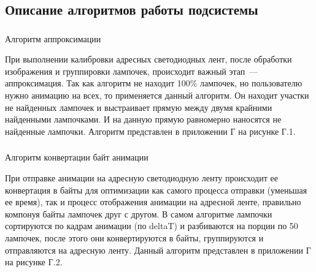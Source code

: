 \subsection{Описание алгоритмов работы подсистемы}
\label{sec:develop:algorithms}

\subsubsection{} Алгоритм аппроксимации
\label{sec:develop:algorithms:approximation}

При выполнении калибровки адресных светодиодных лент, после обработки изображения и группировки лампочек, происходит важный этап~--- аппроксимация. Так как алгоритм не находит 100\% лампочек, но пользователю нужно анимацию на всех, то применяется данный алгоритм. Он находит участки не найденных лампочек и выстраивает прямую между двумя крайними найденными лампочками. И на данную прямую равномерно наносятся не найденные лампочки. Алгоритм представлен в приложении Г на рисунке Г.1.

\subsubsection{} Алгоритм конвертации байт анимации
\label{sec:develop:algorithms:bytesSending}

При отправке анимации на адресную светодиодную ленту происходит ее конвертация в байты для оптимизации как самого процесса отправки (уменьшая ее время), так и процесс отображения анимации на адресной ленте, правильно компонуя байты лампочек друг с другом. В самом алгоритме лампочки сортируются по кадрам анимации (по deltaT) и разбиваются на порции по 50 лампочек, после этого они конвертируются в байты, группируются и отправляются на адресную ленту. Данный алгоритм представлен в приложении Г на рисунке Г.2.